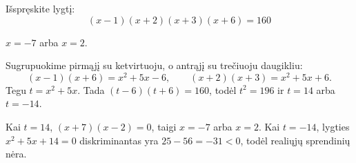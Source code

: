 \begin{salyga}
Išspręskite lygtį:
    \[ (x - 1)(x + 2)(x + 3)(x + 6) = 160 \]
\end{salyga}

\begin{atsakymas}
$x=-7$ arba $x=2$.
\end{atsakymas}

\begin{sprendimas}
Sugrupuokime pirmąjį su ketvirtuoju, o antrąjį su trečiuoju daugikliu:
\[
(x-1)(x+6)=x^2+5x-6,\qquad
(x+2)(x+3)=x^2+5x+6.
\]
Tegu $t=x^2+5x$. Tada $(t-6)(t+6)=160$, todėl $t^2=196$ ir $t=14$ arba $t=-14$.

Kai $t=14$, $(x+7)(x-2)=0$, taigi $x=-7$ arba $x=2$. Kai $t=-14$, lygties $x^2+5x+14=0$ diskriminantas yra $25-56=-31<0$, todėl realiųjų sprendinių nėra.
\end{sprendimas}

